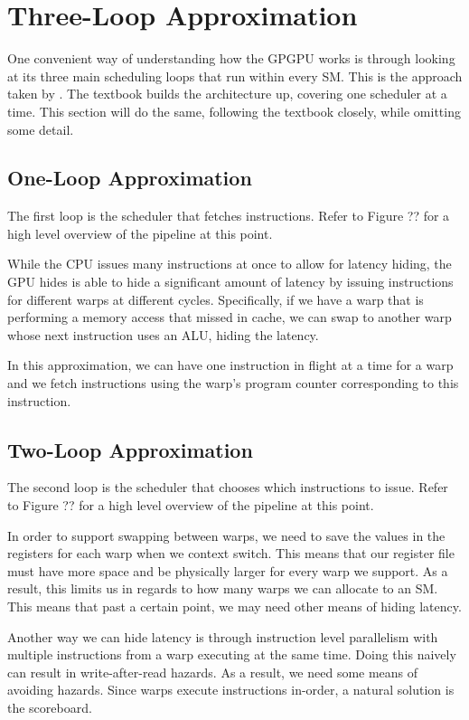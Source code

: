 \section{Three-Loop Approximation}

One convenient way of understanding how the GPGPU works is through
looking at its three main scheduling loops that run within every SM.
This is the approach taken by \cite{aamodt2018general}.
The textbook builds the architecture up, covering one scheduler at a time.
This section will do the same, following the textbook closely, while omitting some detail.

\subsection{One-Loop Approximation}

The first loop is the scheduler that fetches instructions. Refer to Figure ??
for a high level overview of the pipeline at this point.

While the CPU issues many instructions at once to allow for latency
hiding, the GPU hides is able to hide a significant amount of latency by issuing
instructions for different warps at different cycles. Specifically, if we have
a warp that is performing a memory access that missed in cache, we can swap
to another warp whose next instruction uses an ALU, hiding the latency.

In this approximation, we can have one instruction in flight at a time for
a warp and we fetch instructions using the warp's program counter corresponding
to this instruction. 

\subsection{Two-Loop Approximation}

The second loop is the scheduler that chooses which instructions to issue.
Refer to Figure ?? for a high level overview of the pipeline at this point.

In order to support swapping between warps, we need to save the values in
the registers for each warp when we context switch.
This means that our register file must have more space and be physically larger
for every warp we support.
As a result, this limits us in regards to how many warps we can allocate to an
SM. This means that past a certain point, we may need other means of hiding
latency.

Another way we can hide latency is through instruction level parallelism with multiple instructions from a warp executing at the same time.
Doing this naively can result in write-after-read hazards. As a result, we need 
some means of avoiding hazards. Since warps execute instructions in-order,
a natural solution is the scoreboard.

